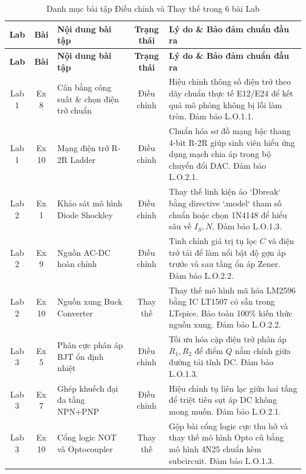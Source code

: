 \documentclass[12pt,a4paper]{report}
\begin{document}
\begin{longtable}{|c|c|p{4.0cm}|c|p{5.5cm}|}
\caption{Danh mục bài tập Điều chỉnh và Thay thế trong 6 bài Lab}
\label{tab:danh_muc_thay_doi}\\
\hline
\rowcolor{codebg}
\textbf{Lab} & \textbf{Bài} & \textbf{Nội dung bài tập} & \textbf{Trạng thái} & \textbf{Lý do \& Bảo đảm chuẩn đầu ra} \\ \hline
\endfirsthead
\hline
\rowcolor{codebg}
\textbf{Lab} & \textbf{Bài} & \textbf{Nội dung bài tập} & \textbf{Trạng thái} & \textbf{Lý do \& Bảo đảm chuẩn đầu ra} \\ \hline
\endhead
\hline
\endfoot

Lab 1 & Ex 8 & Cân bằng công suất \& chọn điện trở chuẩn & Điều chỉnh & Hiệu chỉnh thông số điện trở theo dãy chuẩn thực tế E12/E24 để kết quả mô phỏng không bị lỗi làm tròn. Đảm bảo L.O.1.1. \\ \hline

Lab 1 & Ex 10 & Mạng điện trở R-2R Ladder & Điều chỉnh & Chuẩn hóa sơ đồ mạng bậc thang 4-bit R-2R giúp sinh viên hiểu ứng dụng mạch chia áp trong bộ chuyển đổi DAC. Đảm bảo L.O.2.1. \\ \hline

Lab 2 & Ex 1 & Khảo sát mô hình Diode Shockley & Điều chỉnh & Thay thế linh kiện ảo `Dbreak` bằng directive `.model` tham số chuẩn hoặc chọn 1N4148 để hiểu sâu về $I_S, N$. Đảm bảo L.O.1.3. \\ \hline

Lab 2 & Ex 9 & Nguồn AC-DC hoàn chỉnh & Điều chỉnh & Tinh chỉnh giá trị tụ lọc $C$ và điện trở tải để làm nổi bật độ gợn áp trước và sau tầng ổn áp Zener. Đảm bảo L.O.2.2. \\ \hline

Lab 2 & Ex 10 & Nguồn xung Buck Converter & Thay thế & Thay thế mô hình mã hóa LM2596 bằng IC LT1507 có sẵn trong LTspice. Bảo toàn 100\% kiến thức nguồn xung. Đảm bảo L.O.2.2. \\ \hline

Lab 3 & Ex 5 & Phân cực phân áp BJT ổn định nhiệt & Điều chỉnh & Tối ưu hóa cặp điện trở phân áp $R_1, R_2$ để điểm $Q$ nằm chính giữa đường tải tĩnh DC. Đảm bảo L.O.1.3. \\ \hline

Lab 3 & Ex 7 & Ghép khuếch đại đa tầng NPN+PNP & Điều chỉnh & Hiệu chỉnh tụ liên lạc giữa hai tầng để triệt tiêu sụt áp DC không mong muốn. Đảm bảo L.O.2.1. \\ \hline

Lab 3 & Ex 10 & Cổng logic NOT và Optocoupler & Thay thế & Gộp bài cổng logic cực thu hở và thay thế mô hình Opto cũ bằng mô hình 4N25 chuẩn kèm subcircuit. Đảm bảo L.O.1.3. \\ \hline


\end{longtable}
\end{document}
